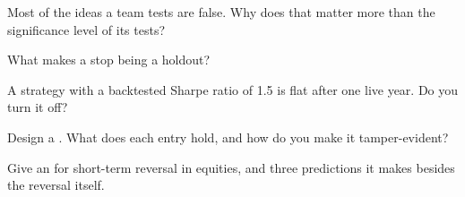 \begin{interviewq}\label{iq:rs:the-research-process:2}
Most of the ideas a team tests are false. Why does that matter more than the significance level of its tests?
\end{interviewq}

\begin{interviewq}\label{iq:rs:the-research-process:3}
What makes a  stop being a holdout?
\end{interviewq}

\begin{interviewq}\label{iq:rs:the-research-process:4}
A strategy with a backtested Sharpe ratio of 1.5 is flat after one live year. Do you turn it off?
\end{interviewq}

\begin{interviewq}\label{iq:rs:the-research-process:5}
Design a . What does each entry hold, and how do you make it tamper-evident?
\end{interviewq}

\begin{interviewq}\label{iq:rs:the-research-process:6}
Give an  for short-term reversal in equities, and three predictions it makes besides the reversal itself.
\end{interviewq}
